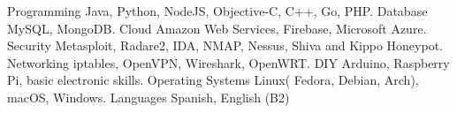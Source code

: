 \begin{cvskills}
  \cvskill
    {Programming}
    {Java, Python, NodeJS, Objective-C, C++, Go, PHP.}
  \cvskill
    {Database}
    {MySQL, MongoDB.}
  \cvskill
    {Cloud}
    {Amazon Web Services, Firebase, Microsoft Azure.}
  \cvskill
    {Security}
    {Metasploit, Radare2, IDA, NMAP, Nessus, Shiva and Kippo Honeypot.}
  \cvskill
    {Networking}
    {iptables, OpenVPN, Wireshark, OpenWRT.}
  \cvskill
    {DIY}
    {Arduino, Raspberry Pi, basic electronic skills.}
  \cvskill
    {Operating Systems}
    {Linux( Fedora, Debian, Arch), macOS, Windows.}
  \cvskill
    {Languages}
    {Spanish, English (B2)}
\end{cvskills}